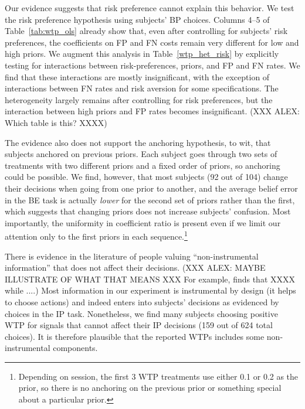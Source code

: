 \documentclass[12pt,a4paper]{article}
\newcommand{\agt}[1]{{\color{OliveGreen}#1}}
\begin{document}
Our evidence suggests that risk preference cannot explain this behavior. We test the risk preference hypothesis using subjects' BP choices. Columns 4--5 of Table~\ref{tab:wtp_ols} already show that, even after controlling for subjects' risk preferences, the coefficients on FP and FN costs remain very different for low and high priors.
We augment this analysis in Table~\ref{wtp_het_risk} by explicitly testing for interactions between risk-preferences, priors, and FP and FN rates. We find that these interactions are mostly insignificant, with the exception of interactions between FN rates and risk aversion for some specifications. The heterogeneity largely remains after controlling for risk preferences, but the interaction between high priors and FP rates becomes insignificant. \agt{(XXX ALEX: Which table is this? XXXX)}

The evidence also does not support the anchoring hypothesis, to wit, that subjects anchored on previous priors. Each subject goes through two sets of treatments with two different priors and a fixed order of priors, so anchoring could be possible.  We find, however, that most subjects (92 out of 104) change their decisions when going from one prior to another, and the average belief error in the BE task is actually \emph{lower} for the second set of priors rather than the first, which suggests that changing priors does not increase subjects' confusion. Most importantly, the uniformity in coefficient ratio is present even if we limit our attention only to the first priors in each sequence.\footnote{Depending on session, the first 3 WTP treatments use either 0.1 or 0.2 as the prior, so there is no anchoring on the previous prior or something special about a particular prior.}

There is evidence in the literature of people valuing ``non-instrumental information'' that does not affect their decisions. \agt{(XXX ALEX: MAYBE ILLUSTRATE OF WHAT THAT MEANS XXX For example, \citet{eliaz_paying_2010} finds that XXXX while  \citet{masatlioglu_intrinsic_2017}....)} Most information in our experiment is instrumental by design (it helps to choose actions) and indeed enters into subjects' decisions as evidenced by choices in the IP task. Nonetheless, we find many subjects choosing positive WTP for signals that cannot affect their IP decisions (159 out of 624 total choices). It is therefore plausible that the reported WTPs includes some non-instrumental components. 
\end{document}
